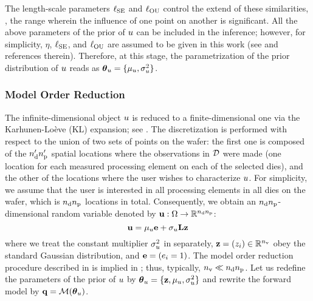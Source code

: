 The length-scale parameters $\ell_{\text{SE}}$ and $\ell_{\text{OU}}$ control the extend of these similarities, \ie, the range wherein the influence of one point on another is significant. All the above parameters of the prior of $u$ can be included in the inference; however, for simplicity, $\eta$, $\ell_{\text{SE}}$, and $\ell_{\text{OU}}$ are assumed to be given in this work (see \cite{marzouk2009} and references therein). Therefore, at this stage, the parametrization of the prior distribution of $u$ reads as ${\boldsymbol\theta}_u = \{ \mu_u, \sigma_u^2 \}$.

\subsubsection{Model Order Reduction} 
The infinite-dimensional object $u$ is reduced to a finite-dimensional one via the Karhunen-Lo\`{e}ve (KL) expansion; see . The discretization is performed with respect to the union of two sets of points on the wafer: the first one is composed of the ${n_\text{d}'} {n_\text{p}'}$ spatial locations where the observations in $\mathcal{D}$ were made (one location for each measured processing element on each of the selected dies), and the other of the locations where the user wishes to characterize $u$. For simplicity, we assume that the user is interested in all processing elements in all dies on the wafer, which is ${n_\text{d}} {n_\text{p}}$ locations in total. Consequently, we obtain an ${n_\text{d}} {n_\text{p}}$-dimensional random variable denoted by $\mathbf{u}: \Omega \to \mathbb{R}^{{n_\text{d}} {n_\text{p}}}$:
\begin{equation} \elabel{kl-approximation}
  \vu = \mu_\u \vI + \sigma_\u \mKL \vz
\end{equation}
where we treat the constant multiplier $\sigma^2_u$ in  separately, $\mathbf{z} = (z_i) \in \mathbb{R}^{n_\text{v}}$ obey the standard Gaussian distribution, and $\mathbf{e} = (e_i = 1)$. The model order reduction procedure described in  is implied in ; thus, typically, ${n_\text{v}} \ll {n_\text{d}} {n_\text{p}}$. Let us redefine the parameters of the prior of $u$ by ${\boldsymbol\theta}_u = \{ \mathbf{z}, \mu_u, \sigma^2_u \}$ and rewrite the forward model by $\mvT = \model{\vparam_\u}$.

